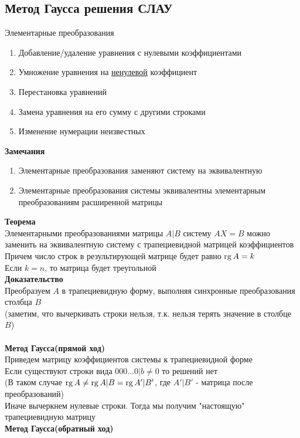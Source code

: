 \documentclass[12pt]{article}
\begin{document}
\subsection{Метод Гаусса решения СЛАУ}
Элементарные преобразования
\begin{enumerate}
    \item Добавление/удаление уравнения с нулевыми коэффициентами
    \item Умножение уравнения на \underline{ненулевой} коэффициент
    \item Перестановка уравнений
    \item Замена уравнения на его сумму с другими строками
    \item Изменение нумерации неизвестных
\end{enumerate}
\textbf{Замечания}
\begin{enumerate}
    \item Элементарные преобразования заменяют систему на эквивалентную
    \item Элементарные преобразования системы эквивалентны элементарным преобразованиям расширенной матрицы
\end{enumerate}
\textbf{Теорема}\\
Элементарными преобразованиями матрицы $A|B$ систему $AX=B$ можно заменить на эквивалентную систему с трапециевидной матрицей коэффициентов\\
Причем число строк в результирующей матрице будет равно $\operatorname{rg} A = k$\\
Если $k = n$, то матрица будет треугольной\\
\textbf{Доказательство}\\
Преобразуем $A$ в трапециевидную форму, выполняя синхронные преобразования столбца $B$\\
(заметим, что вычеркивать строки нельзя, т.к. нельзя терять значение в столбце $B$)\\\\
\textbf{Метод Гаусса(прямой ход)}\\
Приведем матрицу коэффициентов системы к трапециевидной форме\\
Если существуют строки вида $000\ldots0|b\neq 0$ то решений нет\\
(В таком случае $\operatorname{rg} A \neq \operatorname{rg} A|B = \operatorname{rg} A'|B'$, где $A'|B'$ - матрица после преобразований)\\
Иначе вычеркнем нулевые строки. Тогда мы получим "настоящую" трапециевидную матрицу\\
\textbf{Метод Гаусса(обратный ход)}
\end{document}
